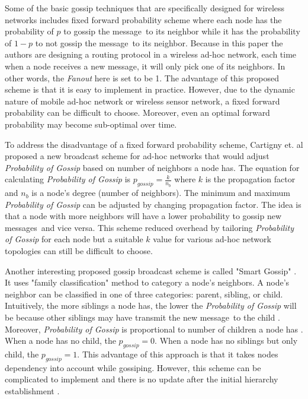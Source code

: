 \documentclass[onehalf,11pt]{beavtex}
\newcommand{\pog}{Probability of Gossip}
\newcommand{\msgs}{messages}
\newcommand{\msg}{message}
\begin{document}
Some of the basic gossip techniques that are specifically designed for wireless networks includes fixed forward probability scheme \cite{haas2006gossip} where each node has the probability of $p$ to gossip the \msg ~to its neighbor while it has the probability of $1-p$ to not gossip the \msg ~to its neighbor. Because in this paper the authors are designing a routing protocol in a wireless ad-hoc network, each time when a node receives a new \msg, it will only pick one of its neighbors. In other words, the \emph{Fanout} here is set to be 1. The advantage of this proposed scheme is that it is easy to implement in practice. However, due to the dynamic nature of mobile ad-hoc network or wireless sensor network, a fixed forward probability can be difficult to choose. Moreover, even an optimal forward probability may become sub-optimal over time. 

To address the disadvantage of a fixed forward probability scheme, Cartigny et. al \cite{cartigny2003border} proposed a new broadcast scheme for ad-hoc networks that would adjust \emph{\pog} based on number of neighbors a node has. The equation for calculating \emph{\pog} is $p_{gossip}=\frac{k}{n_b}$ where $k$ is the propagation factor and $n_b$ is a node's degree (number of neighbors). The minimum and maximum \emph{\pog} can be adjusted by changing propagation factor. The idea is that a node with more neighbors will have a lower probability to gossip new \msgs ~and vice versa. This scheme reduced overhead by tailoring \emph{\pog} for each node but a suitable $k$ value for various ad-hoc network topologies can still be difficult to choose. 

Another interesting proposed gossip broadcast scheme is called "Smart Gossip" \cite{smart}. It uses "family classification" method to category a node's neighbors. A node's neighbor can be classified in one of three categories: parent, sibling, or child. Intuitively, the more siblings a node has, the lower the \emph{\pog} will be because other siblings may have transmit the new \msg ~to the child \cite{2015survey}. Moreover, \emph{\pog} is proportional to number of children a node has \cite{2015survey}. When a node has no child, the $p_{gossip}=0$. When a node has no siblings but only child, the $p_{gossip}=1$. This advantage of this approach is that it takes nodes dependency into account while gossiping. However, this scheme can be complicated to implement and there is no update after the initial hierarchy establishment \cite{2015survey}.
\end{document}
